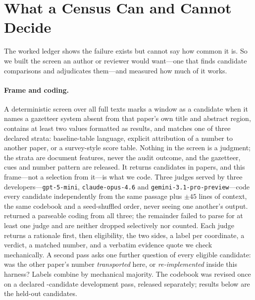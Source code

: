 \documentclass[11pt]{article}
\begin{document}
\section{What a Census Can and Cannot Decide}
\label{sec:census}

The worked ledger shows the failure exists but cannot say how common it is. So
we built the screen an author or reviewer would want---one that finds candidate
comparisons and adjudicates them---and measured how much of it works.

\paragraph{Frame and coding.}
A deterministic screen over all \FrameScreened{} full texts marks a window as a
candidate when it names a gazetteer system absent from that paper's own title
and abstract region, contains at least two values formatted as results, and
matches one of three declared strata: baseline-table language, explicit
attribution of a number to another paper, or a survey-style score table. Nothing
in the screen is a judgment; the strata are document features, never the audit
outcome, and the gazetteer, cues and number pattern are released. It returns \FrameCandidates{} candidates in \FrameFiles{} papers, and
this frame---not a selection from it---is what we code. Three judges served by
three developers---\texttt{gpt-5-mini}, \texttt{claude-opus-4.6} and
\texttt{gemini-3.1-pro-preview}---code every candidate independently from the
same passage plus $\pm45$ lines of context, the same codebook and a
seed-shuffled order, never seeing one another's output. \CensusCoded{} returned
a parseable coding from all three; the remainder failed to parse for at least
one judge and are neither dropped selectively nor counted. Each judge returns a
rationale first, then eligibility, the two sides, a label per coordinate, a
verdict, a matched number, and a verbatim evidence quote we check mechanically.
A second pass asks one further question of every eligible candidate: was the
other paper's number \emph{transported} here, or \emph{re-implemented} inside
this harness? Labels combine by mechanical majority. The codebook was revised once on a
declared \CensusDevSize{}-candidate development pass, released separately;
results below are the \CensusHeldout{} held-out candidates.



\end{document}
